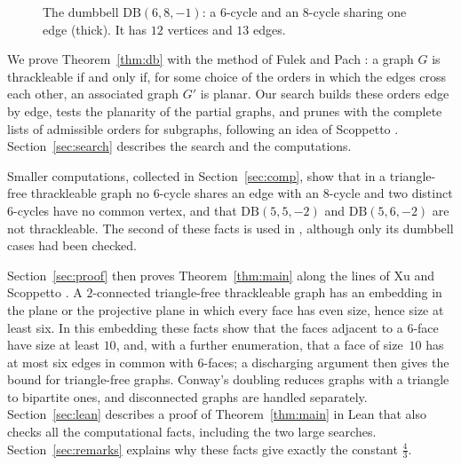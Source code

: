 \documentclass[11pt]{amsart}
\theoremstyle{definition}
\theoremstyle{remark}
\numberwithin{equation}{section}
\newcommand{\DB}{\mathrm{DB}}
\newcommand{\cc}{\frac43}\newcommand{\ccs}{4/3}\newcommand{\ccdec}{1.3333\ldots}
\begin{document}
\begin{figure}[ht]
\centering
{}
\caption{The dumbbell $\DB(6,8,-1)$: a $6$-cycle and an $8$-cycle sharing one edge (thick). It has $12$ vertices and $13$ edges.}\label{fig:db}
\end{figure}

We prove Theorem~\ref{thm:db} with the method of Fulek and Pach \cite{FP11}: a graph $G$ is thrackleable if and only if, for some choice of the orders in which the edges cross each other, an associated graph $G'$ is planar. Our search builds these orders edge by edge, tests the planarity of the partial graphs, and prunes with the complete lists of admissible orders for subgraphs, following an idea of Scoppetto \cite{Sco26}. Section~\ref{sec:search} describes the search and the computations.

Smaller computations, collected in Section~\ref{sec:comp}, show that in a triangle-free thrackleable graph no $6$-cycle shares an edge with an $8$-cycle and two distinct $6$-cycles have no common vertex, and that $\DB(5,5,-2)$ and $\DB(5,6,-2)$ are not thrackleable. The second of these facts is used in \cite{FP19,Sco26}, although only its dumbbell cases had been checked.

Section~\ref{sec:proof} then proves Theorem~\ref{thm:main} along the lines of Xu \cite{Xu21} and Scoppetto \cite{Sco26}. A $2$-connected triangle-free thrackleable graph has an embedding in the plane or the projective plane in which every face has even size, hence size at least six. In this embedding these facts show that the faces adjacent to a $6$-face have size at least $10$, and, with a further enumeration, that a face of size~$10$ has at most six edges in common with $6$-faces; a discharging argument then gives the bound for triangle-free graphs. Conway's doubling reduces graphs with a triangle to bipartite ones, and disconnected graphs are handled separately. Section~\ref{sec:lean} describes a proof of Theorem~\ref{thm:main} in Lean that also checks all the computational facts, including the two large searches. Section~\ref{sec:remarks} explains why these facts give exactly the constant $\cc$.
\end{document}

